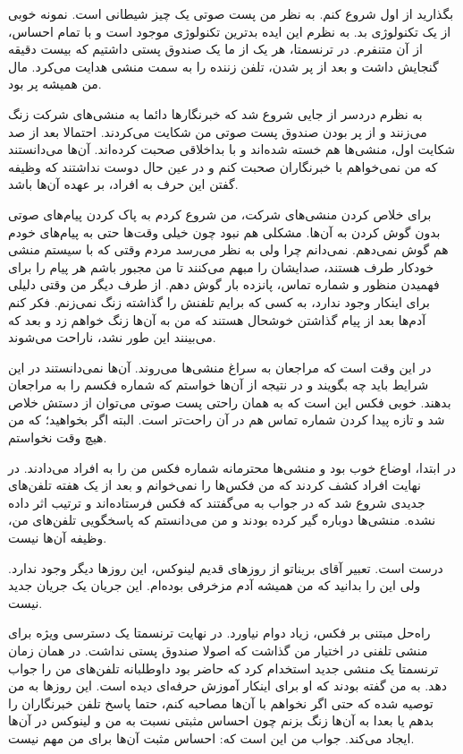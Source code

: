 بگذارید از اول شروع کنم. به نظر من پست صوتی یک چیز شیطانی است. نمونه
خوبی از یک تکنولوژی بد. به نظرم این ایده بدترین تکنولوژی موجود است و
با تمام احساس، از آن متنفرم. در ترنسمتا، هر یک از ما یک صندوق پستی
داشتیم که بیست دقیقه گنجایش داشت و بعد از پر شدن، تلفن زننده را به سمت
منشی هدایت می‌کرد. مال من همیشه پر بود.

به نظرم دردسر از جایی شروع شد که خبرنگارها دائما به منشی‌های شرکت زنگ
می‌زنند و از پر بودن صندوق پست صوتی من شکایت می‌کردند. احتمالا بعد از صد
شکایت اول،‌ منشی‌ها هم خسته شده‌اند و با بداخلاقی صحبت کرده‌اند. آن‌ها
می‌دانستند که من نمی‌خواهم با خبرنگاران صحبت کنم و در عین حال دوست
نداشتند که وظیفه گفتن این حرف به افراد، بر عهده آن‌ها باشد.

برای خلاص کردن منشی‌های شرکت، من شروع کردم به پاک کردن پیام‌های صوتی
بدون گوش کردن به آن‌ها. مشکلی هم نبود چون خیلی وقت‌ها حتی به پیام‌های
خودم هم گوش نمی‌دهم. نمی‌دانم چرا ولی به نظر می‌رسد مردم وقتی که با سیستم
منشی خودکار طرف هستند، صدایشان را مبهم می‌کنند تا من مجبور باشم هر پیام
را برای فهمیدن منظور و شماره تماس، پانزده بار گوش دهم. از طرف دیگر من
وقتی دلیلی برای اینکار وجود ندارد، به کسی که برایم تلفنش را گذاشته زنگ
نمی‌زنم. فکر کنم آدم‌ها بعد از پیام گذاشتن خوشحال هستند که من به آن‌ها
زنگ خواهم زد و بعد که می‌بینند این طور نشد، ناراحت می‌شوند.

در این وقت است که مراجعان به سراغ منشی‌ها می‌روند. آن‌ها نمی‌دانستند در
این شرایط باید چه بگویند و در نتیجه از آن‌ها خواستم که شماره فکسم را به
مراجعان بدهند. خوبی فکس این است که به همان راحتی پست صوتی می‌توان از
دستش خلاص شد و تازه پیدا کردن شماره تماس هم در آن راحت‌تر است. البته
اگر بخواهید؛ که من هیچ وقت نخواستم.

در ابتدا،‌ اوضاع خوب بود و منشی‌ها محترمانه شماره فکس من را به افراد
می‌دادند. در نهایت افراد کشف کردند که من فکس‌ها را نمی‌خوانم و بعد از یک
هفته تلفن‌های جدیدی شروع شد که در جواب به  می‌گفتند
که فکس فرستاده‌اند و ترتیب اثر داده نشده. منشی‌ها دوباره گیر کرده بودند
و من می‌دانستم که پاسخگویی تلفن‌های من، وظیفه آن‌ها نیست.

درست است. تعبیر آقای بریناتو از روزهای قدیم لینوکس، این روزها دیگر
وجود ندارد. ولی این را بدانید که من همیشه آدم مزخرفی بوده‌ام. این جریان
یک جریان جدید نیست.

راه‌حل مبتنی بر فکس، زیاد دوام نیاورد. در نهایت ترنسمتا یک دسترسی ویژه
برای منشی تلفنی در اختیار من گذاشت که اصولا صندوق پستی نداشت. در همان
زمان ترنسمتا یک منشی جدید استخدام کرد که حاضر بود داوطلبانه تلفن‌های من
را جواب دهد. به من گفته بودند که او برای اینکار آموزش حرفه‌ای دیده
است. این روزها به من توصیه شده که حتی اگر نخواهم با آن‌ها مصاحبه کنم،
حتما پاسخ تلفن خبرنگاران را بدهم یا بعدا به آن‌ها زنگ بزنم چون احساس
مثبتی نسبت به من و لینوکس در آن‌ها ایجاد می‌کند. جواب من این است که:
احساس مثبت آن‌ها برای من مهم نیست.

